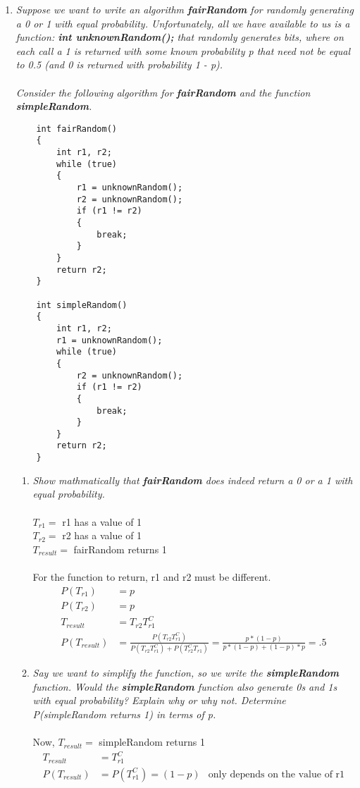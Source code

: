 \documentclass{article} %
\begin{document}
\begin{enumerate}
	\item \textit{Suppose we want to write an algorithm \textbf{fairRandom} for randomly generating a 0 or 1 with equal probability. Unfortunately, all we have available to us is a function: \textbf{int unknownRandom();} that randomly generates bits, where on each call a 1 is returned with some known probability p that need not be equal to 0.5 (and 0 is returned with probability 1 - p).\\
	\\
	Consider the following algorithm for \textbf{fairRandom} and the function \textbf{simpleRandom}.}
	\begin{lstlisting}
	int fairRandom()
	{
		int r1, r2;
		while (true)
		{
			r1 = unknownRandom();
			r2 = unknownRandom();
			if (r1 != r2)
			{
				break;
			}
		}
		return r2;
	}
	
	int simpleRandom()
	{
		int r1, r2;
		r1 = unknownRandom();
		while (true)
		{
			r2 = unknownRandom();
			if (r1 != r2)
			{
				break;
			}
		}
		return r2;
	}
	\end{lstlisting}
	\begin{enumerate}
	\item \textit{Show mathmatically that \textbf{fairRandom} does indeed return a 0 or a 1 with equal probability.}\\
	\\
	$T_{r1} =$ r1 has a value of 1\\
	$T_{r2} =$ r2 has a value of 1\\
	$T_{result} =$ fairRandom returns 1\\
	\\
	For the function to return, r1 and r2 must be different.
	\begin{align*}
	P(T_{r1}) &= p\\
	P(T_{r2}) &= p\\
	T_{result} &= T_{r2}T_{r1}^C\\
	P(T_{result}) &= \frac{P(T_{r2}T_{r1}^C)}{P(T_{r2}T_{r1}^C) + P(T_{r2}^CT_{r1})} = \frac{p * (1 - p)}{p * (1 - p) + (1 - p) * p} = .5
	\end{align*}
	
	\item \textit{Say we want to simplify the function, so we write the \textbf{simpleRandom} function. Would the \textbf{simpleRandom} function also generate 0s and 1s with equal probability? Explain why or why not. Determine P(simpleRandom returns 1) in terms of p.}\\
	\\
	Now, $T_{result} =$ simpleRandom returns 1
	\begin{align*}
	T_{result} &= T_{r1}^C\\
	P(T_{result}) &= P(T_{r1}^C) = (1 - p) &\text{only depends on the value of r1}
	\end{align*}	
	

\end{enumerate}
\end{enumerate}
\end{document}
